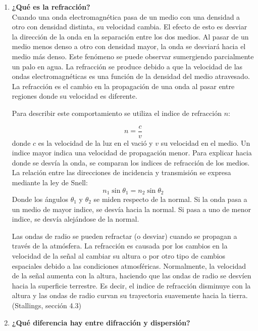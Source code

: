 \documentclass[11pt,a4paper]{article}
\begin{document}
\begin{enumerate}[label=4.\arabic*), itemsep=0.3cm]
        En conclusión, la pérdida en el espacio libre es el principal mecanismo de atenuación asociado a la distancia en un enlace satelital, mientras que los fenómenos atmosféricos y las condiciones de instalación introducen pérdidas adicionales que deben considerarse en el balance del enlace.
  \item
        \textbf{¿Qué es la refracción?} \\
        Cuando una onda electromagnética pasa de un medio con una densidad a otro con densidad distinta, su velocidad cambia. El efecto de esto es desviar la dirección de la onda en la separación entre los dos medios. Al pasar de un medio menos denso a otro con densidad mayor, la onda se desviará hacia el medio más denso. Este fenómeno se puede observar sumergiendo parcialmente un palo en agua. La refracción se produce debido a que la velocidad de las ondas electromagnéticas es una función de la densidad del medio atravesado. La refracción es el cambio en la propagación de una onda al pasar entre regiones donde su velocidad es diferente.

        Para describir este comportamiento se utiliza el indice de refracción $n$:

        $$n = \frac{c}{v}$$
        donde $c$ es la velocidad de la luz en el vació y $v$ su velocidad en el medio. Un indice mayor indica una velocidad de propagación menor. Para explicar hacia donde se desvía la onda, se comparan los indices de refracción de los medios. La relación entre las direcciones de incidencia y transmisión se expresa mediante la ley de Snell:
        $$n_1\sin\theta_1=n_2\sin\theta_2$$
        Donde los ángulos $\theta_1$ y $\theta_2$ se miden respecto de la normal. Si la onda pasa a un medio de mayor indice, se desvía hacia la normal. Si pasa a uno de menor indice, se desvía alejándose de la normal.

        Las ondas de radio se pueden refractar (o desviar) cuando se propagan a través de la atmósfera. La refracción es causada por los cambios en la velocidad de la señal al cambiar su altura o por otro tipo de cambios espaciales debido a las condiciones atmosféricas. Normalmente, la velocidad de la señal aumenta con la altura, haciendo que las ondas de radio se desvíen hacia la superficie terrestre. Es decir, el indice de refracción disminuye con la altura y las ondas de radio curvan su trayectoria suavemente hacia la tierra. (Stallings, sección 4.3)
  \item
        \textbf{¿Qué diferencia hay entre difracción y dispersión?}


\end{enumerate}
\end{document}
